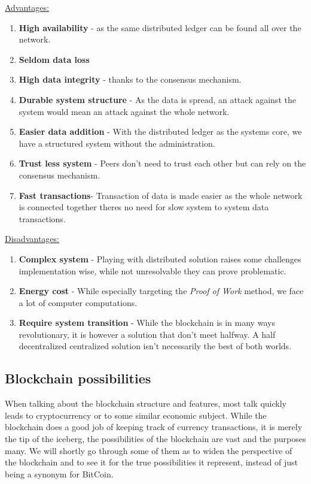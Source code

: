 \documentclass[paper=a4, fontsize=11pt]{scrartcl} %
\numberwithin{equation}{section} %
\numberwithin{figure}{section} %
\numberwithin{table}{section} %
\begin{document}
\underline{Advantages:}
\begin{enumerate}
\item \textbf{High availability} - as the same distributed ledger can be found all over the network.
\item \textbf{Seldom data loss}
\item \textbf{High data integrity} - thanks to the consensus mechanism.
\item \textbf{Durable system structure} - As the data is spread, an attack against the system would mean an attack against the whole network. 
\item \textbf{Easier data addition} - With the distributed ledger as the systems core, we have a structured system without the administration.
\item \textbf{Trust less system} - Peers don't need to trust each other but can rely on the consensus mechanism.
\item \textbf{Fast transactions}- Transaction of data is made easier as the whole network is connected together theres no need for slow system to system data transactions. 
\end{enumerate}

\underline{Disadvantages:}
\begin{enumerate}
\item \textbf{Complex system} - Playing with distributed solution raises some challenges implementation wise, while not unresolvable they can prove problematic.
\item \textbf{Energy cost} - While especially targeting the \textit{Proof of Work} method, we face a lot of computer computations.
\item \textbf{Require system transition} - While the blockchain is in many ways revolutionary, it is however a solution that don't meet halfway. A half decentralized centralized solution isn't necessarily the best of both worlds.
\end{enumerate}

\subsection{Blockchain possibilities}

When talking about the blockchain structure and features, most talk quickly leads to cryptocurrency or to some similar economic subject. While the blockchain does a good job of keeping track of currency transactions, it is merely the tip of the iceberg, the possibilities of the blockchain are vast and the purposes many. We will shortly go through some of them as to widen the perspective of the blockchain and to see it for the true possibilities it represent, instead of just being a synonym for BitCoin.\\
\end{document}
